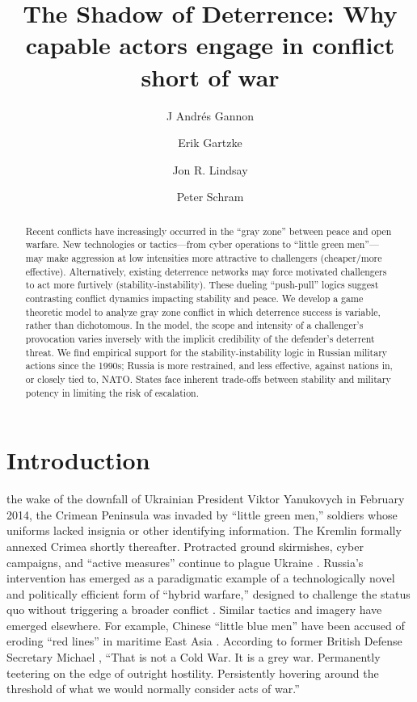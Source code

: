 \documentclass[bibtex, autowc]{apsr_submission}
\title{The Shadow of Deterrence: Why capable actors engage in conflict short of war}
\author{J Andr\'{e}s Gannon}
       {University of California, San Diego}
       {J Andres Gannon is a PhD Candidate in the Department of Political Science, University of California, San Diego. Corresponding Author (jagannon@ucsd.edu).}
\author{Erik Gartzke}
       {University of California, San Diego}
       {Erik Gartzke is a Professor of Political Science at the University of California, San Diego. (egartzke@ucsd.edu).}
\author{Jon R. Lindsay}
       {University of Toronto}
       {Jon R. Lindsay is an Assistant Professor of Digital Media and Global Affairs at the University of Toronto. (jon.lindsay@utoronto.ca).}
\author{Peter Schram}
       {Vanderbilt University}
       {Peter Schram is an Assistant Professor of Political Science at Vanderbilt University. (peter.schram@vanerbilt.edu).}
\begin{document}
\begin{frontmatter}
\begin{abstract}
Recent conflicts have increasingly occurred in the ``gray zone'' between peace and open warfare. New technologies or tactics---from cyber operations to ``little green men''---may make aggression at low intensities more attractive to challengers (cheaper/more effective). Alternatively, existing deterrence networks may force motivated challengers to act more furtively (stability-instability). These dueling ``push-pull'' logics suggest contrasting conflict dynamics impacting stability and peace. We develop a game theoretic model to analyze gray zone conflict in which deterrence success is variable, rather than dichotomous. In the model, the scope and intensity of a challenger's provocation varies inversely with the implicit credibility of the defender's deterrent threat. We find empirical support for the stability-instability logic in Russian military actions since the 1990s; Russia is more restrained, and less effective, against nations in, or closely tied to, NATO. States face inherent trade-offs between stability and military potency in limiting the risk of escalation. 
\end{abstract}
\end{frontmatter}

\section{Introduction}

 the wake of the downfall of Ukrainian President Viktor Yanukovych in February 2014, the Crimean Peninsula was invaded by “little green men,” soldiers whose uniforms lacked insignia or other identifying information. The Kremlin formally annexed Crimea shortly thereafter. Protracted ground skirmishes, cyber campaigns, and ``active measures'' continue to plague Ukraine \citep{angevine_learninglessonsukraine_2019}. Russia's intervention has emerged as a paradigmatic example of a technologically novel and politically efficient form of ``hybrid warfare,'' designed to challenge the status quo without triggering a broader conflict \citep{marten_putinchoicesexplaining_2015, lanoszka_russianhybridwarfare_2016, chivvis_hybridwarrussian_2017}. Similar tactics and imagery have emerged elsewhere. For example, Chinese ``little blue men'' have been accused of eroding ``red lines'' in maritime East Asia \citep{green_counteringcoercionmaritime_2017}. According to former British Defense Secretary Michael \citet{fallon_speechdeliveredsecretary_2017}, ``That is not a Cold War. It is a grey war. Permanently teetering on the edge of outright hostility. Persistently hovering around the threshold of what we would normally consider acts of war.'' 
\end{document}
